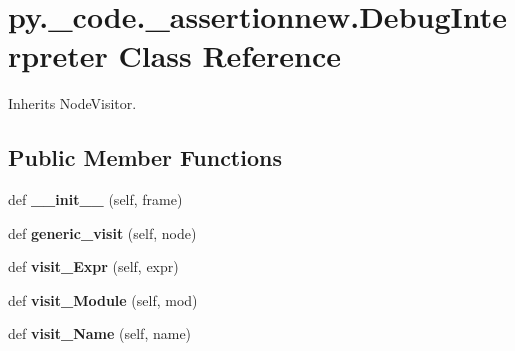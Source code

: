 \hypertarget{classpy_1_1__code_1_1__assertionnew_1_1_debug_interpreter}{}\section{py.\+\_\+code.\+\_\+assertionnew.\+Debug\+Interpreter Class Reference}
\label{classpy_1_1__code_1_1__assertionnew_1_1_debug_interpreter}


Inherits Node\+Visitor.

\subsection*{Public Member Functions}
\begin{DoxyCompactItemize}
\item 
\mbox{\label{classpy_1_1__code_1_1__assertionnew_1_1_debug_interpreter_ab3d90054a45d1e78ab0fa7eef6c01543}} 
def {\bfseries \+\_\+\+\_\+init\+\_\+\+\_\+} (self, frame)
\item 
\mbox{\label{classpy_1_1__code_1_1__assertionnew_1_1_debug_interpreter_a1b52b7f0fbf6beb59adc49c6b55f960f}} 
def {\bfseries generic\+\_\+visit} (self, node)
\item 
\mbox{\label{classpy_1_1__code_1_1__assertionnew_1_1_debug_interpreter_ad75e6c602707a9c0552089b692fa52f1}} 
def {\bfseries visit\+\_\+\+Expr} (self, expr)
\item 
\mbox{\label{classpy_1_1__code_1_1__assertionnew_1_1_debug_interpreter_a413169479fbaec69da586054e62cae83}} 
def {\bfseries visit\+\_\+\+Module} (self, mod)
\item 
\mbox{\label{classpy_1_1__code_1_1__assertionnew_1_1_debug_interpreter_a6304ec18d22dfd142b4daa1035f86a01}} 
def {\bfseries visit\+\_\+\+Name} (self, name)
\item 
\mbox{\label{classpy_1_1__code_1_1__assertionnew_1_1_debug_interpreter_a35c8917d6b7d674cfa11efd00f7deb93}} 

\end{DoxyCompactItemize}
